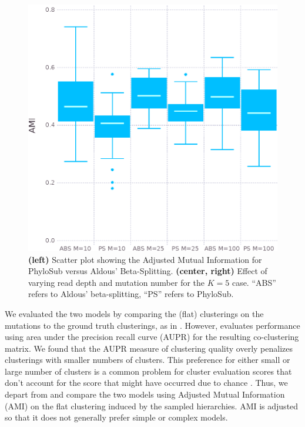 \documentclass{bioinfo}
\begin{document}
\begin{figure}
\includegraphics[width=0.9\columnwidth]{../figures/ami_boxplot_N_M.eps}
\caption{\textbf{(left)} Scatter plot showing the Adjusted Mutual Information for PhyloSub versus Aldous' Beta-Splitting.  \textbf{(center, right)} Effect of varying read depth and mutation number for the $K=5$ case.  ``ABS'' refers to Aldous' beta-splitting, ``PS'' refers to PhyloSub.}
\label{fig:scatter}
\end{figure}


We evaluated the two models by comparing the (flat) clusterings on the mutations to the ground truth clusterings, as in \cite{Jiao2014}.  However, \cite{Jiao2014} evaluates performance using area under the precision recall curve (AUPR) for the resulting co-clustering matrix.  We found that the AUPR measure of clustering quality overly penalizes clusterings with smaller numbers of clusters.   This preference for either small or large number of clusters is a common problem for cluster evaluation scores that don't account for the score that might have occurred due to chance \cite{Vinh2010}.  Thus, we depart from \cite{Jiao2014} and compare the two models using Adjusted Mutual Information (AMI) \cite{Vinh2009} on the flat clustering induced by the sampled hierarchies.  AMI is adjusted so that it does not generally prefer simple or complex models.
\end{document}
